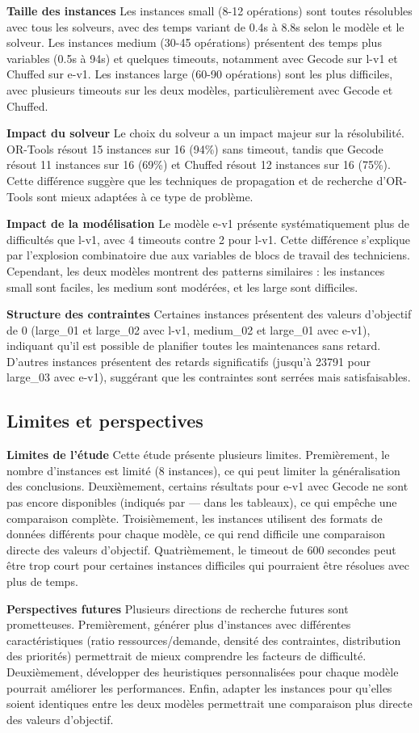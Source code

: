 \textbf{Taille des instances} Les instances small (8-12 opérations) sont toutes résolubles avec tous les solveurs, avec des temps variant de 0.4s à 8.8s selon le modèle et le solveur. Les instances medium (30-45 opérations) présentent des temps plus variables (0.5s à 94s) et quelques timeouts, notamment avec Gecode sur l-v1 et Chuffed sur e-v1. Les instances large (60-90 opérations) sont les plus difficiles, avec plusieurs timeouts sur les deux modèles, particulièrement avec Gecode et Chuffed.

\textbf{Impact du solveur} Le choix du solveur a un impact majeur sur la résolubilité. OR-Tools résout 15 instances sur 16 (94\%) sans timeout, tandis que Gecode résout 11 instances sur 16 (69\%) et Chuffed résout 12 instances sur 16 (75\%). Cette différence suggère que les techniques de propagation et de recherche d'OR-Tools sont mieux adaptées à ce type de problème.

\textbf{Impact de la modélisation} Le modèle e-v1 présente systématiquement plus de difficultés que l-v1, avec 4 timeouts contre 2 pour l-v1. Cette différence s'explique par l'explosion combinatoire due aux variables de blocs de travail des techniciens. Cependant, les deux modèles montrent des patterns similaires : les instances small sont faciles, les medium sont modérées, et les large sont difficiles.

\textbf{Structure des contraintes} Certaines instances présentent des valeurs d'objectif de 0 (large\_01 et large\_02 avec l-v1, medium\_02 et large\_01 avec e-v1), indiquant qu'il est possible de planifier toutes les maintenances sans retard. D'autres instances présentent des retards significatifs (jusqu'à 23791 pour large\_03 avec e-v1), suggérant que les contraintes sont serrées mais satisfaisables.

\subsection{Limites et perspectives}

\textbf{Limites de l'étude} Cette étude présente plusieurs limites. Premièrement, le nombre d'instances est limité (8 instances), ce qui peut limiter la généralisation des conclusions. Deuxièmement, certains résultats pour e-v1 avec Gecode ne sont pas encore disponibles (indiqués par --- dans les tableaux), ce qui empêche une comparaison complète. Troisièmement, les instances utilisent des formats de données différents pour chaque modèle, ce qui rend difficile une comparaison directe des valeurs d'objectif. Quatrièmement, le timeout de 600 secondes peut être trop court pour certaines instances difficiles qui pourraient être résolues avec plus de temps.

\textbf{Perspectives futures} Plusieurs directions de recherche futures sont prometteuses. Premièrement, générer plus d'instances avec différentes caractéristiques (ratio ressources/demande, densité des contraintes, distribution des priorités) permettrait de mieux comprendre les facteurs de difficulté. Deuxièmement, développer des heuristiques personnalisées pour chaque modèle pourrait améliorer les performances. Enfin, adapter les instances pour qu'elles soient identiques entre les deux modèles permettrait une comparaison plus directe des valeurs d'objectif.
